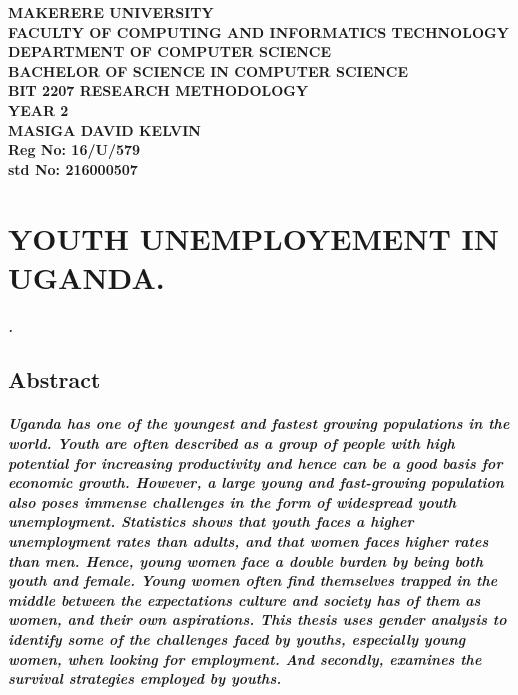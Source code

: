 \documentclass[a4paper,12pt]{article}
\begin{document}
\begin{Huge}
\begin{center}
\begin{normalsize}

\textbf{MAKERERE UNIVERSITY } \\
\textbf{FACULTY OF COMPUTING AND INFORMATICS TECHNOLOGY} \\
\textbf{DEPARTMENT OF COMPUTER SCIENCE} \\
\textbf{BACHELOR OF SCIENCE IN COMPUTER SCIENCE} \\
\textbf{BIT 2207 RESEARCH METHODOLOGY} \\
\textbf{YEAR 2} \\


\textbf{\sc MASIGA DAVID KELVIN } \\
\textbf{\sc Reg No: 16/U/579 } \\
\textbf{\sc std No: 216000507}\\
\end{normalsize}
\end{center}
\end{Huge}
\newpage

\section{\sc YOUTH UNEMPLOYEMENT IN UGANDA.}
\paragraph{\sl  .}

\subsection{\sc Abstract}
\paragraph{ \sl Uganda has one of the youngest and fastest growing populations in the world. Youth are often described as a group of people with high potential for increasing productivity and hence can be a good basis for economic growth. However, a large young and fast-growing population also poses immense challenges in the form of widespread youth unemployment. Statistics shows that youth faces a higher unemployment rates than adults, and that women faces higher rates than men. Hence, young women face a double burden by being both youth and female. Young women often find themselves trapped in the middle between the expectations culture and society has of them as women, and their own aspirations. This thesis uses gender analysis to identify some of the challenges faced by youths, especially young women, when looking for employment. And secondly, examines the survival strategies employed by youths.}
\end{document}
